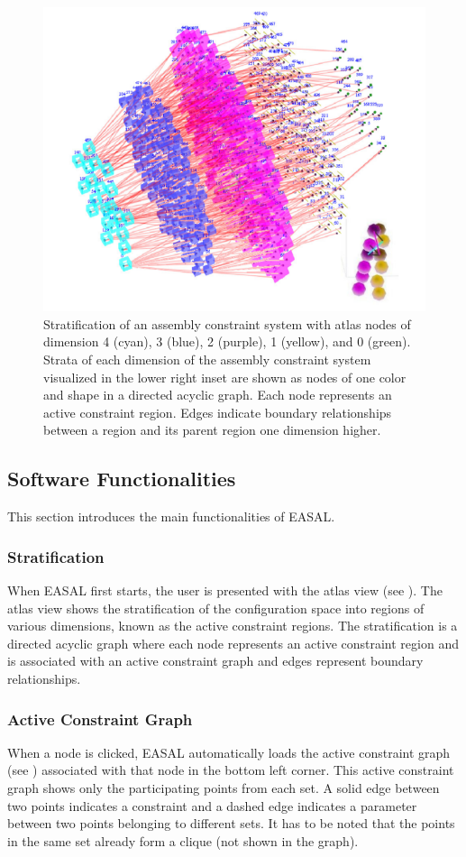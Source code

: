 \documentclass[10pt]{article}
\begin{document}
\begin{figure}
\begin{center}
\includegraphics[width=.6\linewidth]{fig/Stratification.png}
\end{center}
\caption{Stratification of an assembly constraint system with atlas nodes of
dimension 4 (cyan), 3 (blue), 2 (purple), 1 (yellow), and 0 (green). Strata of
each dimension of the assembly constraint system visualized in the lower right
inset are shown as nodes of one color and shape in a directed acyclic graph.
Each node represents an active constraint region. Edges indicate boundary
relationships between a region and its parent region one dimension higher.}
\label{fig:atlas}
\end{figure}


\subsection{Software Functionalities}
\label{sec:part2functionalities}

This section introduces the main functionalities of EASAL.


\subsubsection{Stratification}
When EASAL first starts, the user is presented with the atlas view (see
).  The atlas view shows the stratification of the
configuration space into regions of various dimensions, known as the active
constraint regions. The stratification is a directed acyclic graph where each
node represents an active constraint region and is associated with an active
constraint graph and edges represent boundary relationships.

\subsubsection{Active Constraint Graph}
When a node is clicked, EASAL automatically loads the active constraint graph
(see ) associated with that node in the bottom left corner.
This active constraint graph shows only the participating points from each set.
A solid edge between two points indicates a constraint and a dashed edge
indicates a parameter between two points belonging to different sets. It has to
be noted that the points in the same set already form a clique (not shown in
the graph).
\end{document}
